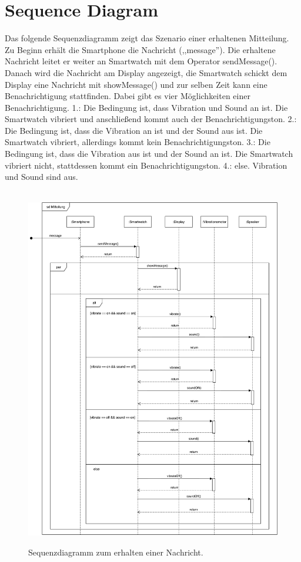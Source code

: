 

\section{Sequence Diagram}

Das folgende Sequenzdiagramm zeigt das Szenario einer erhaltenen Mitteilung. Zu Beginn erhält die Smartphone die Nachricht (,,message''). Die erhaltene Nachricht leitet er weiter an Smartwatch mit dem Operator sendMessage(). Danach wird die Nachricht am Display angezeigt, die Smartwatch schickt dem Display eine Nachricht mit showMessage() und zur selben Zeit kann eine Benachrichtigung stattfinden. Dabei gibt es vier Möglichkeiten einer Benachrichtigung.
1.: Die Bedingung ist, dass Vibration und Sound an ist. Die Smartwatch vibriert und anschließend kommt auch der Benachrichtigungston.
2.: Die Bedingung ist, dass die Vibration an ist und der Sound aus ist. Die Smartwatch vibriert, allerdings kommt kein Benachrichtigungston.
3.: Die Bedingung ist, dass die Vibration aus ist und der Sound an ist. Die Smartwatch vibriert nicht, stattdessen kommt ein Benachrichtigungston.
4.: else. Vibration und Sound sind aus.

\begin{figure}[h]
\centering\
\includegraphics[width=\textwidth]{img/seqMessage}
\caption{Sequenzdiagramm zum erhalten einer Nachricht.}\label{fig:seqMessage}
\end{figure}

